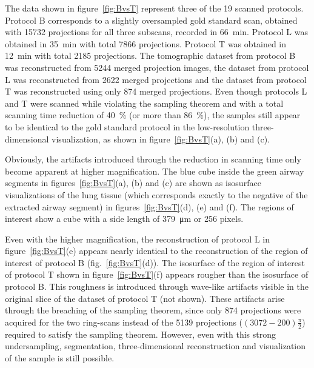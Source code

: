 The data shown in figure~\ref{fig:BvsT} represent three of the 19 scanned protocols. Protocol B corresponds to a slightly oversampled gold standard scan, obtained with 15732 projections for all three subscans, recorded in \SI{66}{\minute}. Protocol L was obtained in \SI{35}{\minute} with total 7866 projections. Protocol T was obtained in \SI{12}{\minute} with total 2185 projections. The tomographic dataset from protocol B was reconstructed from 5244 merged projection images, the dataset from protocol L was reconstructed from 2622 merged projections and the dataset from protocol T was reconstructed using only 874 merged projections. Even though protocols L and T were scanned while violating the sampling theorem and with a total scanning time reduction of \SI{40}{\percent} (or more than \SI{86}{\percent}), the samples still appear to be identical to the gold standard protocol in the low-resolution three-dimensional visualization, as shown in figure~\ref{fig:BvsT}(a), (b) and (c).

Obviously, the artifacts introduced through the reduction in scanning time only become apparent at higher magnification. The blue cube inside the green airway segments in figures~\ref{fig:BvsT}(a), (b) and (c) are shown as isosurface visualizations of the lung tissue (which corresponds exactly to the negative of the extracted airway segment) in figures~\ref{fig:BvsT}(d), (e) and (f). The regions of interest show a cube with a side length of \SI{379}{\micro\meter} or 256 pixels.

Even with the higher magnification, the reconstruction of protocol L in figure~\ref{fig:BvsT}(e) appears nearly identical to the reconstruction of the region of interest of protocol B (fig.~\ref{fig:BvsT}(d)). The isosurface of the region of interest of protocol T shown in figure~\ref{fig:BvsT}(f) appears rougher than the isosurface of protocol B. This roughness is introduced through wave-like artifacts visible in the original slice of the dataset of protocol T (not shown). These artifacts arise through the breaching of the sampling theorem, since only 874 projections were acquired for the two ring-scans instead of the 5139 projections ($(3072-200)\frac{\pi}{2}$) required to satisfy the sampling theorem. However, even with this strong undersampling, segmentation, three-dimensional reconstruction and visualization of the sample is still possible.

